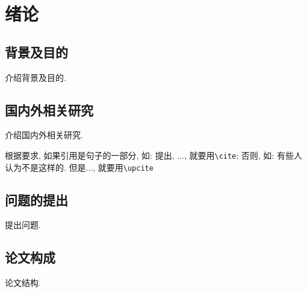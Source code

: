 \section{绪论}

\subsection{背景及目的}
介绍背景及目的.

\subsection{国内外相关研究}
介绍国内外相关研究.

根据要求, 如果引用是句子的一部分, 如: \cite{sigsegv}提出, ...,
就要用\verb+\cite+; 否则, 如: 有些人认为不是这样的. 但是..., 就要用\verb+\upcite+

\subsection{问题的提出}
提出问题.

\subsection{论文构成}
论文结构.

